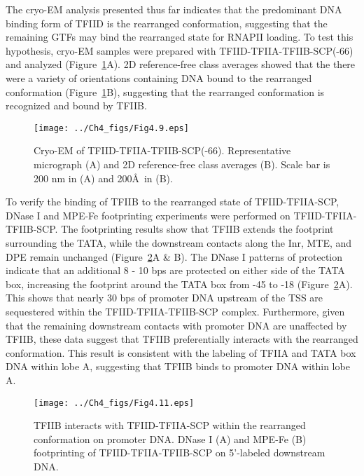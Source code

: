 The cryo-EM analysis presented thus far indicates that the predominant DNA binding form of TFIID is the rearranged conformation, suggesting that the remaining GTFs may bind the rearranged state for RNAPII loading. To test this hypothesis, cryo-EM samples were prepared with TFIID-TFIIA-TFIIB-SCP(-66) and analyzed (Figure~\ref{fig:Fig4.9}A). 2D reference-free class averages showed that the there were a variety of orientations containing DNA bound to the rearranged conformation (Figure~\ref{fig:Fig4.9}B), suggesting that the rearranged conformation is recognized and bound by TFIIB. \\
\begin{figure}
\centering
\texttt{[image: ../Ch4\_figs/Fig4.9.eps]}
\caption[Cryo-EM of TFIID-TFIIA-TFIIB-SCP(-66)]{Cryo-EM of TFIID-TFIIA-TFIIB-SCP(-66). Representative micrograph (A) and 2D reference-free class averages (B).  Scale bar is 200 nm in (A) and 200\AA\ in (B).}
\label{fig:Fig4.9}
\end{figure}
\indent To verify the binding of TFIIB to the rearranged state of TFIID-TFIIA-SCP, DNase I and MPE-Fe footprinting experiments were performed on TFIID-TFIIA-TFIIB-SCP. The footprinting results show that TFIIB extends the footprint surrounding the TATA, while the downstream contacts along the Inr, MTE, and DPE remain unchanged (Figure~\ref{fig:Fig4.11}A \& B). The DNase I patterns of protection indicate that an additional 8 - 10 bps are protected on either side of the TATA box, increasing the footprint around the TATA box from -45 to -18 (Figure~\ref{fig:Fig4.11}A). This shows that nearly 30 bps of promoter DNA upstream of the TSS are sequestered within the TFIID-TFIIA-TFIIB-SCP complex. Furthermore, given that the remaining downstream contacts with promoter DNA are unaffected by TFIIB, these data suggest that TFIIB preferentially interacts with the rearranged conformation. This result is consistent with the labeling of TFIIA and TATA box DNA within lobe A, suggesting that TFIIB binds to promoter DNA within lobe A.\\
\begin{figure}
\centering
\texttt{[image: ../Ch4\_figs/Fig4.11.eps]}
\caption[TFIIB interacts with TFIID-TFIIA-SCP within the rearranged conformation on promoter DNA]{TFIIB interacts with TFIID-TFIIA-SCP within the rearranged conformation on promoter DNA. DNase I (A) and MPE-Fe (B) footprinting of TFIID-TFIIA-TFIIB-SCP on 5'-labeled downstream DNA. }
\label{fig:Fig4.11}
\end{figure}
